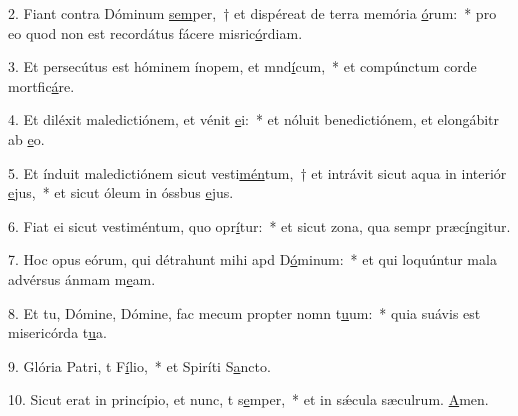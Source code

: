 2. Fiant contra Dóminum \uline{sem}per,~† et dispéreat de terra memória \uline{ó}rum:~* pro eo quod non est recordátus fácere misric\uline{ó}rdiam.\par 
3. Et persecútus est hóminem ínopem, et mnd\uline{í}cum,~* et compúnctum corde mortfic\uline{á}re.\par 
4. Et diléxit maledictiónem, et vénit \uline{e}i:~* et nóluit benedictiónem, et elongábitr ab \uline{e}o.\par 
5. Et índuit maledictiónem sicut vesti\uline{mén}tum,~† et intrávit sicut aqua in interiór \uline{e}jus,~* et sicut óleum in óssbus \uline{e}jus.\par 
6. Fiat ei sicut vestiméntum, quo opr\uline{í}tur:~* et sicut zona, qua sempr præc\uline{í}ngitur.\par 
7. Hoc opus eórum, qui détrahunt mihi apd D\uline{ó}minum:~* et qui loquúntur mala advérsus ánmam m\uline{e}am.\par 
8. Et tu, Dómine, Dómine, fac mecum propter nomn t\uline{u}um:~* quia suávis est misericórda t\uline{u}a.\par 
9. Glória Patri, t F\uline{í}lio,~* et Spiríti S\uline{a}ncto.\par 
10. Sicut erat in princípio, et nunc, t s\uline{e}mper,~* et in sǽcula sæculrum. \uline{A}men.\par 
